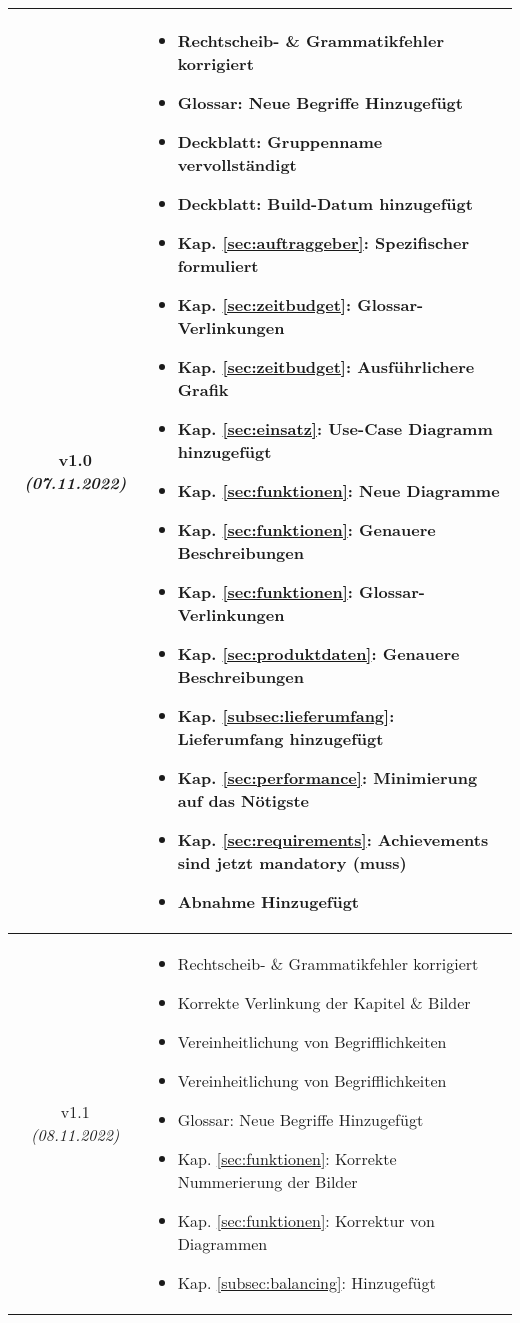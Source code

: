 \begin{xltabular}{\textwidth}{|c|X|}
    v1.0  \textit{(07.11.2022)} & \begin{itemize}
        \item Rechtscheib- \& Grammatikfehler korrigiert
        \item Glossar: Neue Begriffe Hinzugefügt
        \item Deckblatt: Gruppenname vervollständigt
        \item Deckblatt: Build-Datum hinzugefügt
        \item Kap. \ref{sec:auftraggeber}: Spezifischer formuliert
        \item Kap. \ref{sec:zeitbudget}: Glossar-Verlinkungen
        \item Kap. \ref{sec:zeitbudget}: Ausführlichere Grafik
        \item Kap. \ref{sec:einsatz}: Use-Case Diagramm hinzugefügt
        \item Kap. \ref{sec:funktionen}: Neue Diagramme
        \item Kap. \ref{sec:funktionen}: Genauere Beschreibungen
        \item Kap. \ref{sec:funktionen}: Glossar-Verlinkungen
        \item Kap. \ref{sec:produktdaten}: Genauere Beschreibungen
        \item Kap. \ref{subsec:lieferumfang}: Lieferumfang hinzugefügt
        \item Kap. \ref{sec:performance}: Minimierung auf das Nötigste
        \item Kap. \ref{sec:requirements}: Achievements sind jetzt mandatory (\gls{muss})
        \item Abnahme Hinzugefügt
    \end{itemize}
    \\ \hline

    v1.1  \textit{(08.11.2022)} & \begin{itemize}
        \item Rechtscheib- \& Grammatikfehler korrigiert
        \item Korrekte Verlinkung der Kapitel \& Bilder
        \item Vereinheitlichung von Begrifflichkeiten
        \item Vereinheitlichung von Begrifflichkeiten
        \item Glossar: Neue Begriffe Hinzugefügt
        \item Kap. \ref{sec:funktionen}: Korrekte Nummerierung der Bilder
        \item Kap. \ref{sec:funktionen}: Korrektur von Diagrammen
        \item Kap. \ref{subsec:balancing}: Hinzugefügt
    \end{itemize}
    \\ \hline


\end{xltabular}
